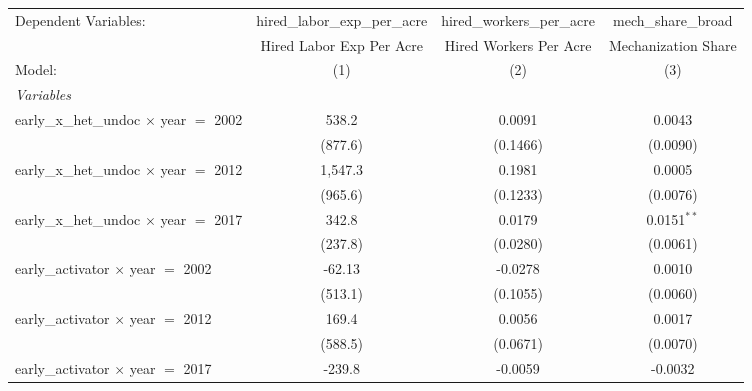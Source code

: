 
\begingroup
\centering
\begin{tabular}{lccc}
   \tabularnewline \midrule \midrule
   Dependent Variables:                            & hired\_labor\_exp\_per\_acre     & hired\_workers\_per\_acre    & mech\_share\_broad\\    
                                                   & Hired Labor Exp Per Acre         & Hired Workers Per Acre       & Mechanization Share \\   
   Model:                                          & (1)                              & (2)                          & (3)\\  
   \midrule
   \emph{Variables}\\
   early\_x\_het\_undoc $\times$ year $=$ 2002     & 538.2                            & 0.0091                       & 0.0043\\   
                                                   & (877.6)                          & (0.1466)                     & (0.0090)\\   
   early\_x\_het\_undoc $\times$ year $=$ 2012     & 1,547.3                          & 0.1981                       & 0.0005\\   
                                                   & (965.6)                          & (0.1233)                     & (0.0076)\\   
   early\_x\_het\_undoc $\times$ year $=$ 2017     & 342.8                            & 0.0179                       & 0.0151$^{**}$\\   
                                                   & (237.8)                          & (0.0280)                     & (0.0061)\\   
   early\_activator $\times$ year $=$ 2002         & -62.13                           & -0.0278                      & 0.0010\\   
                                                   & (513.1)                          & (0.1055)                     & (0.0060)\\   
   early\_activator $\times$ year $=$ 2012         & 169.4                            & 0.0056                       & 0.0017\\   
                                                   & (588.5)                          & (0.0671)                     & (0.0070)\\   
   early\_activator $\times$ year $=$ 2017         & -239.8                           & -0.0059                      & -0.0032\\   

\end{tabular}
